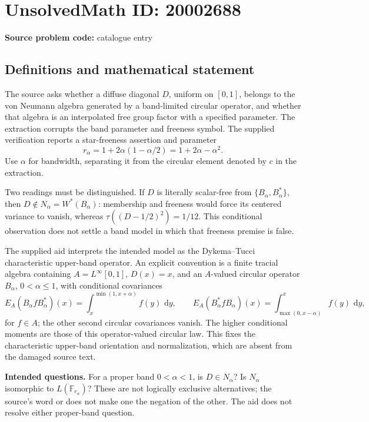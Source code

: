 \documentclass[11pt]{article}
\newcommand{\dd}{\,\mathrm{d}}
\begin{document}
\section*{UnsolvedMath ID: 20002688}
\textbf{Source problem code:} catalogue entry
\subsection{Definitions and mathematical statement}
The source asks whether a diffuse diagonal \(D\), uniform on \([0,1]\), belongs to the von Neumann algebra generated by a band-limited circular operator, and whether that algebra is an interpolated free group factor with a specified parameter. The extraction corrupts the band parameter and freeness symbol. The supplied verification reports a star-freeness assertion and parameter
\[
 r_\alpha=1+2\alpha(1-\alpha/2)=1+2\alpha-\alpha^2.
\]
Use \(\alpha\) for bandwidth, separating it from the circular element denoted by \(c\) in the extraction.

Two readings must be distinguished. If \(D\) is literally scalar-free from \(\{B_\alpha,B_\alpha^*\}\), then \(D\notin N_\alpha=W^*(B_\alpha)\): membership and freeness would force its centered variance to vanish, whereas \(\tau((D-1/2)^2)=1/12\). This conditional observation does not settle a band model in which that freeness premise is false.

The supplied aid interprets the intended model as the Dykema--Tucci characteristic upper-band operator. An explicit convention is a finite tracial algebra containing \(A=L^\infty[0,1]\), \(D(x)=x\), and an \(A\)-valued circular operator \(B_\alpha\), \(0<\alpha\le1\), with conditional covariances
\[
 E_A(B_\alpha f B_\alpha^*)(x)
       =\int_x^{\min(1,x+\alpha)}f(y)\,\dd y,
 \qquad
 E_A(B_\alpha^* f B_\alpha)(x)
       =\int_{\max(0,x-\alpha)}^x f(y)\,\dd y,
\]
for \(f\in A\); the other second circular covariances vanish. The higher conditional moments are those of this operator-valued circular law. This fixes the characteristic upper-band orientation and normalization, which are absent from the damaged source text.

\textbf{Intended questions.} For a proper band \(0<\alpha<1\), is \(D\in N_\alpha\)? Is \(N_\alpha\) isomorphic to \(L(\mathbb F_{r_\alpha})\)? These are not logically exclusive alternatives; the source's word or does not make one the negation of the other. The aid does not resolve either proper-band question.
\end{document}
